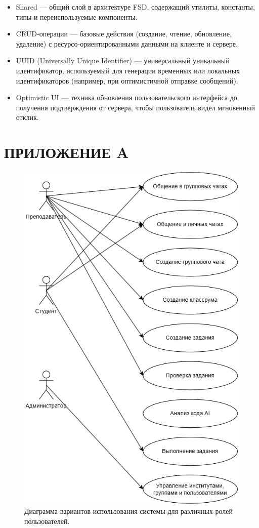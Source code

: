 \begin{itemize}
  \item Shared — общий слой в архитектуре FSD, содержащий утилиты, константы, типы и переиспользуемые компоненты.
  \item CRUD-операции — базовые действия (создание, чтение, обновление, удаление) с ресурсо-ориентированными данными на клиенте и сервере.
  \item UUID (Universally Unique Identifier) — универсальный уникальный идентификатор, используемый для генерации временных или локальных идентификаторов (например, при оптимистичной отправке сообщений).
  \item Optimistic UI — техника обновления пользовательского интерфейса до получения подтверждения от сервера, чтобы пользователь видел мгновенный отклик.
\end{itemize}

\newpage
{}
\tableofcontents









\newpage

\section*{ПРИЛОЖЕНИЕ A}

\setcounter{figure}{0} 
\makeatletter
  \renewcommand{\thefigure}{A.\arabic{figure}}
\makeatother


\begin{figure}[H]
\centering
\includegraphics[width=0.5\linewidth]{static/useCaseDiagramm}
\caption{Диаграмма вариантов использования системы для различных ролей пользователей.}
\label{fig:usecasediagramm}
\end{figure}


